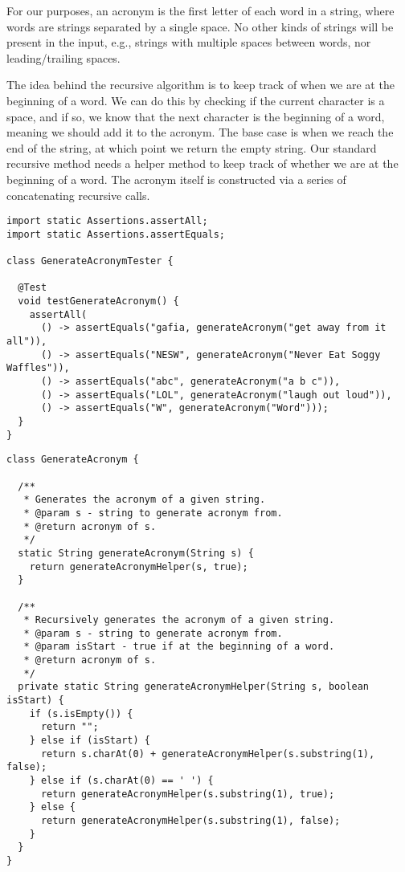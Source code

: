 For our purposes, an acronym is the first letter of each word in a string, where words are strings separated by a single space. 
No other kinds of strings will be present in the input, e.g., strings with multiple spaces between words, nor leading/trailing spaces.

The idea behind the recursive algorithm is to keep track of when we are at the beginning of a word.
We can do this by checking if the current character is a space, and if so, we know that the next character is the beginning of a word, meaning we should add it to the acronym.
The base case is when we reach the end of the string, at which point we return the empty string.
Our standard recursive method needs a helper method to keep track of whether we are at the beginning of a word.
The acronym itself is constructed via a series of concatenating recursive calls.

\begin{lstlisting}[language=MyJava]
import static Assertions.assertAll;
import static Assertions.assertEquals;

class GenerateAcronymTester {

  @Test
  void testGenerateAcronym() {
    assertAll(
      () -> assertEquals("gafia, generateAcronym("get away from it all")),
      () -> assertEquals("NESW", generateAcronym("Never Eat Soggy Waffles")),
      () -> assertEquals("abc", generateAcronym("a b c")),
      () -> assertEquals("LOL", generateAcronym("laugh out loud")),
      () -> assertEquals("W", generateAcronym("Word")));
  }
}
\end{lstlisting}

\begin{lstlisting}[language=MyJava]
class GenerateAcronym {

  /**
   * Generates the acronym of a given string.
   * @param s - string to generate acronym from.
   * @return acronym of s.
   */
  static String generateAcronym(String s) {
    return generateAcronymHelper(s, true);
  }

  /**
   * Recursively generates the acronym of a given string.
   * @param s - string to generate acronym from.
   * @param isStart - true if at the beginning of a word.
   * @return acronym of s.
   */
  private static String generateAcronymHelper(String s, boolean isStart) {
    if (s.isEmpty()) { 
      return ""; 
    } else if (isStart) { 
      return s.charAt(0) + generateAcronymHelper(s.substring(1), false); 
    } else if (s.charAt(0) == ' ') { 
      return generateAcronymHelper(s.substring(1), true); 
    } else { 
      return generateAcronymHelper(s.substring(1), false); 
    }
  }
}
\end{lstlisting}


